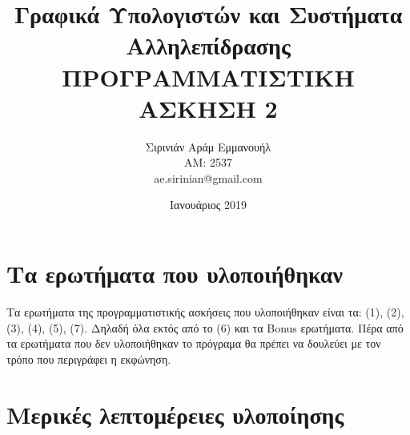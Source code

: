 \documentclass{article}
\title{Γραφικά Υπολογιστών και Συστήματα Αλληλεπίδρασης\\ ΠΡΟΓΡΑΜΜΑΤΙΣΤΙΚΗ ΑΣΚΗΣΗ 2}
\author{Σιρινιάν Αράμ Εμμανουήλ \\ AM: 2537\\ \selectlanguage{english}ae.sirinian@gmail.com\selectlanguage{greek}}
\date{Ιανουάριος 2019}
\begin{document}
\maketitle

\section{Τα ερωτήματα που υλοποιήθηκαν}

Τα ερωτήματα της προγραμματιστικής ασκήσεις που υλοποιήθηκαν είναι τα:
(1), (2), (3), (4), (5), (7).
Δηλαδή όλα εκτός από το
(6)
και τα
Bonus
ερωτήματα. Πέρα από τα ερωτήματα που δεν υλοποιήθηκαν
το πρόγραμα θα πρέπει να δουλεύει με τον τρόπο που περιγράφει η εκφώνηση.

\section{Μερικές λεπτομέρειες υλοποίησης}
\end{document}
